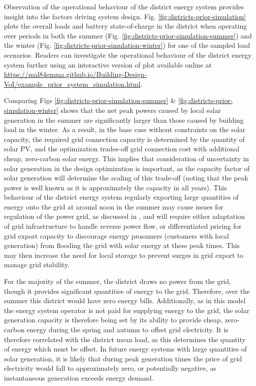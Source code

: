 \begin{subappendices}
    Observation of the operational behaviour of the district energy system provides insight into the factors driving system design. Fig. \ref{fig:districts-prior-simulation} plots the overall loads and battery state-of-charge in the district when operating over periods in both the summer (Fig. \ref{fig:districts-prior-simulation-summer}) and the winter (Fig. \ref{fig:districts-prior-simulation-winter}) for one of the sampled load scenarios. Readers can investigate the operational behaviour of the district energy system further using an interactive version of plot available online at \url{https://mal84emma.github.io/Building-Design-VoI/example_prior_system_simulation.html}.

    Comparing Figs \ref{fig:districts-prior-simulation-summer} \& \ref{fig:districts-prior-simulation-winter} shows that the net peak powers caused by local solar generation in the summer are significantly larger than those caused by building load in the winter. As a result, in the base case without constraints on the solar capacity, the required grid connection capacity is determined by the quantity of solar PV, and the optimization trades-off grid connection cost with additional cheap, zero-carbon solar energy. This implies that consideration of uncertainty in solar generation in the design optimization is important, as the capacity factor of solar generation will determine the scaling of this trade-off (noting that the peak power is well known as it is approximately the capacity in all years). This behaviour of the district energy system regularly exporting large quantities of energy onto the grid at around noon in the summer may cause issues for regulation of the power grid, as discussed in \citep{iweh2021DistributedGenerationRenewable}, and will require either adaptation of grid infrastructure to handle reverse power flow, or differentiated pricing for grid export capacity to discourage energy prosumers (customers with local generation) from flooding the grid with solar energy at these peak times. This may then increase the need for local storage to prevent surges in grid export to manage grid stability.

    For the majority of the summer, the district draws no power from the grid, though it provides significant quantities of energy to the grid. Therefore, over the summer this district would have zero energy bills. Additionally, as in this model the energy system operator is not paid for supplying energy to the grid, the solar generation capacity is therefore being set by its ability to provide cheap, zero-carbon energy during the spring and autumn to offset grid electricity. It is therefore correlated with the district mean load, as this determines the quantity of energy which must be offset. In future energy systems with large quantities of solar generation, it is likely that during peak generation times the price of grid electricity would fall to approximately zero, or potentially negative, as instantaneous generation exceeds energy demand.


\end{subappendices}
